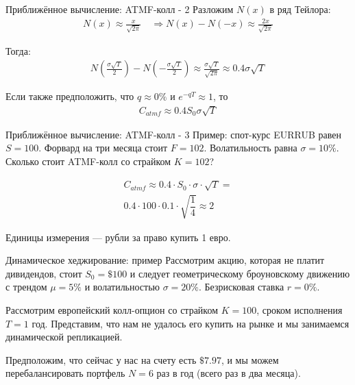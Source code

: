 \documentclass{beamer}
\begin{document}
\begin{frame}{Приближённое вычисление: ATMF-колл - 2}
\justify
Разложим $N(x)$ в ряд Тейлора:
\begin{align*}
N(x) \approx \frac{x}{\sqrt{2\pi}} \quad \Rightarrow
N(x) - N(-x) \approx \frac{2x}{\sqrt{2\pi}}
\end{align*}

Тогда:
\begin{align*}
N\left(\frac{\sigma \sqrt{T}}{2}\right) - N\left(-\frac{\sigma \sqrt{T}}{2}\right)
\approx
\frac{\sigma\sqrt{T}}{\sqrt{2\pi}}
\approx
0.4\sigma\sqrt{T}
\end{align*}

Если также предположить, что $q\approx 0\%$ и $e^{-qT} \approx 1$, то
\begin{align*}
C_{atmf} \approx 0.4 S_0 \sigma \sqrt{T}
\end{align*}
\end{frame}



\begin{frame}{Приближённое вычисление: ATMF-колл - 3}
\justify
Пример: спот-курс EURRUB равен $S=100$. Форвард на три месяца стоит $F=102$. Волатильность равна $\sigma=10\%$. Сколько стоит ATMF-колл со страйком $K=102$?

\begin{align*}
C_{atmf} \approx 0.4 \cdot S_0 \cdot \sigma \cdot \sqrt{T} = \\
0.4 \cdot 100 \cdot 0.1 \cdot \sqrt{\dfrac{1}{4}} \approx 2
\end{align*}

Единицы измерения --- рубли за право купить 1 евро.
\end{frame}



\begin{frame}{Динамическое хеджирование: пример}
\justify
Рассмотрим акцию, которая не платит дивидендов, стоит $S_0=\$100$ и следует 
геометрическому броуновскому движению с трендом $\mu=5\%$ и волатильностью
$\sigma=20\%$. Безрисковая ставка $r=0\%$.

\justify
Рассмотрим европейский колл-опцион со страйком $K=100$, сроком исполнения $T=1$ год. 
Представим, что нам не удалось его купить на рынке и мы занимаемся динамической 
репликацией.

\justify
Предположим, что сейчас у нас на счету есть $\$7.97$, и мы можем перебалансировать портфель $N=6$ раз в год (всего раз в два месяца).
\end{frame}
\end{document}
